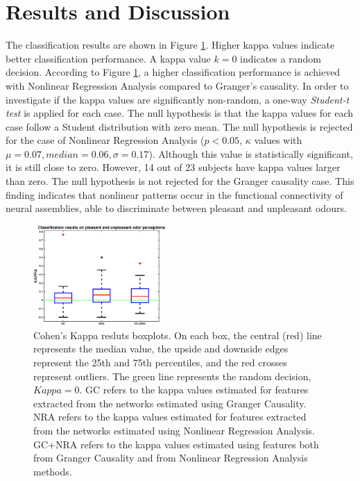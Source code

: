 \section{Results and Discussion}

The classification results are shown in Figure \ref{fig:kappa}. Higher kappa values indicate better classification performance. A kappa value $k=0$ indicates a random decision. According to Figure \ref{fig:kappa}, a higher classification performance is achieved with Nonlinear Regression Analysis compared to Granger's causality. In order to investigate if the kappa values are significantly non-random, a one-way \emph{Student-t test} is applied for each case. The null hypothesis is that the kappa values for each case follow a Student distribution with zero mean. The null hypothesis is rejected for the case of Nonlinear Regression Analysis ($p<0.05$, $\kappa$ values with $\mu = 0.07, median = 0.06,\sigma = 0.17$). Although this value is statistically significant, it is still close to zero. However, 14 out of 23 subjects have kappa values larger than zero. The null hypothesis is not rejected for the Granger causality case. This finding indicates that nonlinear patterns occur in the functional connectivity of neural assemblies, able to discriminate between pleasant and unpleasant odours. 

\begin{figure}[t]
    \centering
    \includegraphics[width=0.45\textwidth]{./images/kappa.eps}
    \caption{Cohen's Kappa resluts boxplots. On each box, the central (red) line represents the median value, the upside and downside edges represent the 25th and 75th percentiles, and the red crosses represent outliers. The green line represents the random decision, $Kappa=0$. GC refers to the kappa values estimated for features extracted from the networks estimated using Granger Causality. NRA refers to the kappa values estimated for features extracted from the networks estimated using Nonlinear Regression Analysis. GC+NRA refers to the kappa values estimated using features both from Granger Causality and from Nonlinear Regression Analysis methods.}
    \label{fig:kappa}
\end{figure}

